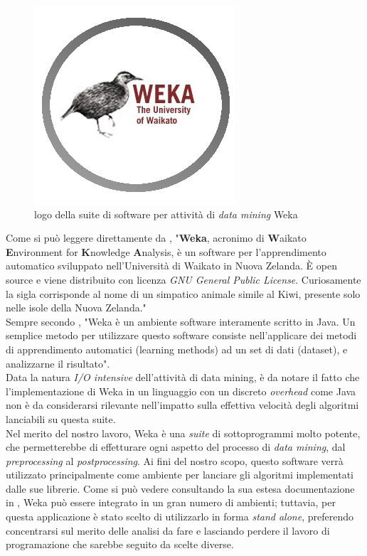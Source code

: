         \begin{figure}
            \centering
            \caption{logo della suite di software per attività di \textit{data mining} Weka}
            \label{weka}
    	    \includegraphics[scale=0.65]{img/weka.jpg}
        \end{figure}

    Come si può leggere direttamente da \cite{wekawiki}, "\textbf{Weka}, acronimo di \textbf{W}aikato \textbf{E}nvironment for \textbf{K}nowledge \textbf{A}nalysis, è un software per l'apprendimento automatico sviluppato nell'Università di Waikato in Nuova Zelanda. È open source e viene distribuito con licenza \textit{GNU General Public License}. Curiosamente la sigla corrisponde al nome di un simpatico animale simile al Kiwi, presente solo nelle isole della Nuova Zelanda." \\

    Sempre secondo \cite{wekawiki}, "Weka è un ambiente software interamente scritto in Java. Un semplice metodo per utilizzare questo software consiste nell'applicare dei metodi di apprendimento automatici (learning methods) ad un set di dati (dataset), e analizzarne il risultato". \\

    Data la natura \textit{I/O intensive} dell'attività di data mining, è da notare il fatto che l'implementazione di Weka in un linguaggio con un discreto \textit{overhead} come Java non è da considerarsi rilevante nell'impatto sulla effettiva velocità degli algoritmi lanciabili su questa suite.\\

    Nel merito del nostro lavoro, Weka è una \textit{suite} di sottoprogrammi molto potente, che permetterebbe di effetturare ogni aspetto del processo di \textit{data mining}, dal \textit{preprocessing} al \textit{postprocessing}. Ai fini del nostro scopo, questo software verrà utilizzato principalmente come ambiente per lanciare gli algoritmi implementati dalle sue librerie. Come si può vedere consultando la sua estesa documentazione in \cite{weka}, Weka può essere integrato in un gran numero di ambienti; tuttavia, per questa applicazione è stato scelto di utilizzarlo in forma \textit{stand alone}, preferendo concentrarsi sul merito delle analisi da fare e lasciando perdere il lavoro di programazione che sarebbe seguito da scelte diverse.\\

